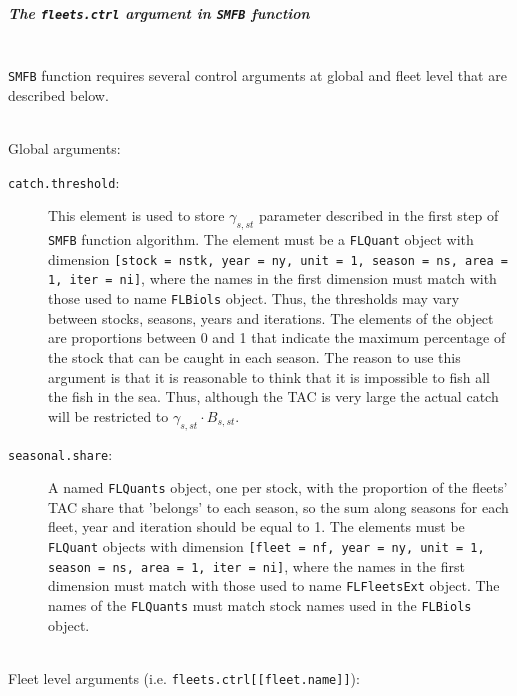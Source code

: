 \subparagraph{The \texttt{fleets.ctrl} argument in \texttt{SMFB} function}
\quad\\	

	\texttt{SMFB} function requires several control arguments at global and fleet level that are described below.

  \quad\\
		Global arguments:
		\begin{description}
		
			\item[\texttt{catch.threshold}:] This element is used to store $\gamma_{s,st}$ parameter described in
				the first step of \texttt{SMFB} function algorithm. The element must be a \texttt{FLQuant} object with dimension 
		        \texttt{[stock = nstk, year = ny, unit = 1, season = ns, area = 1, iter = ni]}, where the
	            names in the first dimension must match with those used to name \texttt{FLBiols} object. 
	            Thus, the thresholds may vary between stocks, seasons, years and iterations.
	    		The elements of the object are proportions between 0 and 1 that indicate the maximum percentage of the 
	    		stock that can be caught in each season. The reason to use this argument is that it is reasonable to think
	    		that it is impossible to fish all the fish in the sea. Thus, although the TAC is very large the actual catch
	    		will be restricted to  $\gamma_{s,st}\cdot B_{s,st}$.
			
			\item[\texttt{seasonal.share}:]  A named \texttt{FLQuants} object, one per stock, with the proportion of the 
				fleets' TAC share that 'belongs' to each season, so the sum along seasons for each fleet, year and iteration
				should be equal to 1.	The elements must be \texttt{FLQuant} objects with dimension 
		        \texttt{[fleet = nf, year = ny, unit = 1, season = ns, area = 1, iter = ni]}, where the
	            names in the first dimension must match with those used to name \texttt{FLFleetsExt} object. 
	            The names of the \texttt{FLQuants} must match stock names used in the \texttt{FLBiols} object. 
		\end{description}
		
	\quad\\			
		Fleet level arguments (i.e. \texttt{fleets.ctrl[[fleet.name]]}):
    		
